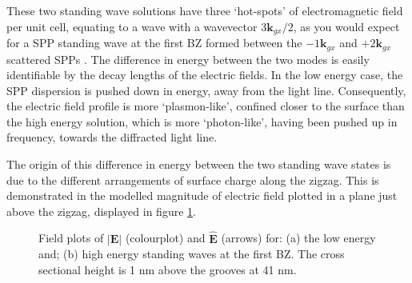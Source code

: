 These two standing wave solutions have three `hot-spots' of electromagnetic field per unit cell, equating to a wave with a wavevector $3\mathbf{k}_{gx}/2$, as you would expect for a SPP standing wave at the first BZ formed between the $-1\mathbf{k}_{gx}$ and $+2\mathbf{k}_{gx}$ scattered SPPs . The difference in energy between the two modes is easily identifiable by the decay lengths of the electric fields. In the low energy case, the SPP dispersion is pushed down in energy, away from the light line. Consequently, the electric field profile is more `plasmon-like', confined closer to the surface than the high energy solution, which is more `photon-like', having been pushed up in frequency, towards the diffracted light line.

The origin of this difference in energy between the two standing wave states is due to the different arrangements of surface charge along the zigzag. This is demonstrated in the modelled magnitude of electric field plotted in a plane just above the zigzag, displayed in figure \ref{fig:asyzz-magE-xz-41nm}.

\begin{figure}
\begin{center}
\end{center}
\caption[Field plots of $|\mathbf{E}|$ (colourplot) and $\hat{\mathbf{E}}$ (arrows) for the low energy and high energy standing waves at the first BZ.]{Field plots of $|\mathbf{E}|$ (colourplot) and $\hat{\mathbf{E}}$ (arrows) for: (a) the low energy and; (b) high energy standing waves at the first BZ. The cross sectional height is 1 nm above the grooves at 41 nm.\label{fig:asyzz-magE-xz-41nm}}
\end{figure}

